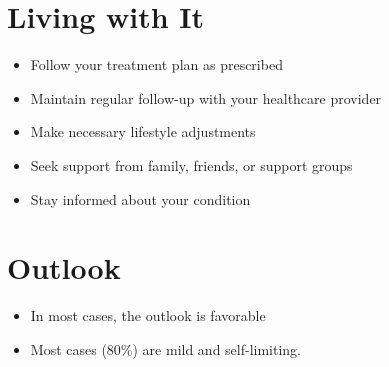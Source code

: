 \section{Living with It}
\begin{itemize}[noitemsep]
  \item Follow your treatment plan as prescribed
  \item Maintain regular follow-up with your healthcare provider
  \item Make necessary lifestyle adjustments
  \item Seek support from family, friends, or support groups
  \item Stay informed about your condition
\end{itemize}
\section{Outlook}
\begin{itemize}[noitemsep]
  \item In most cases, the outlook is favorable
  \item Most cases (80\%) are mild and self-limiting.
\end{itemize}
